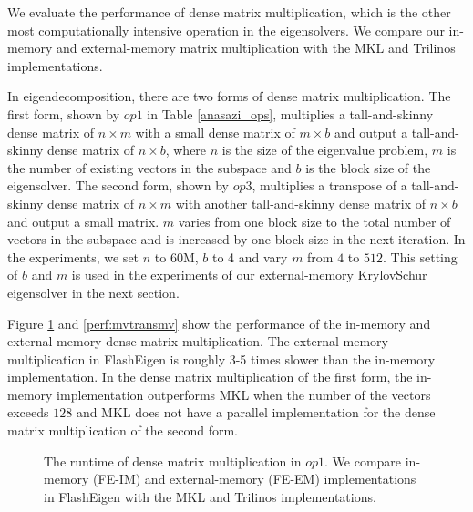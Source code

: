 We evaluate the performance of dense matrix multiplication, which is the other
most computationally intensive operation in the eigensolvers. We compare our
in-memory and external-memory matrix multiplication with the MKL and Trilinos
implementations.

In eigendecomposition, there are two forms of dense matrix multiplication.
The first form, shown by $op1$ in Table \ref{anasazi_ops}, multiplies
a tall-and-skinny dense matrix of $n \times m$
with a small dense matrix of $m \times b$ and output a tall-and-skinny dense
matrix of $n \times b$, where $n$ is the size of the eigenvalue problem,
$m$ is the number of existing vectors in the subspace and $b$ is the block
size of the eigensolver. The second form, shown by $op3$, multiplies
a transpose of a tall-and-skinny dense matrix
of $n \times m$ with another tall-and-skinny dense matrix of $n \times b$
and output a small matrix. $m$ varies from one block size to the total number
of vectors in the subspace and is increased by one block size in the next
iteration. In the experiments, we set $n$ to 60M, $b$ to 4 and vary $m$
from $4$ to $512$. This setting of $b$ and $m$ is used in the experiments
of our external-memory KrylovSchur eigensolver in the next section.

Figure \ref{perf:gemm} and \ref{perf:mvtransmv} show the performance of
the in-memory and external-memory dense matrix multiplication.
The external-memory multiplication in FlashEigen is roughly 3-5 times slower
than the in-memory implementation. In the dense matrix multiplication of
the first form, the in-memory implementation outperforms MKL when the number
of the vectors exceeds $128$ and MKL does not have a parallel implementation
for the dense matrix multiplication of the second form. 




\begin{figure}
	\begin{center}
		\footnotesize
		\vspace{-15pt}
		
		\vspace{-15pt}
		\caption{The runtime of dense matrix multiplication in $op1$. We compare
			in-memory (FE-IM) and external-memory (FE-EM) implementations
			in FlashEigen with the MKL and Trilinos implementations.}
		\label{perf:gemm}
	\end{center}
\end{figure}

